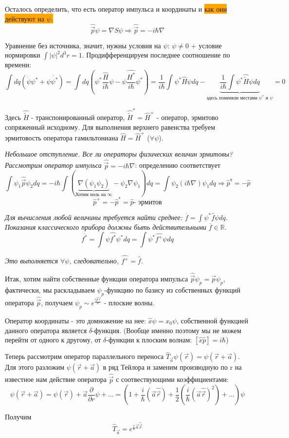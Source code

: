 \par Осталось определить, что есть оператор импульса и координаты и  \colorbox{orange}{как они действуют на $\psi$.}
$$ \hat{\vec{p}} \psi = \nabla S \psi  \Longrightarrow \hat{\vec{p}} = -i \hbar \nabla  $$
\par Уравнение без источника, значит, нужны условия на $\psi$:  $\psi \ne 0 $ + условие нормировки $\int |\psi|^2 d^3r = 1$. Продифференцируем последнее соотношение по времени:
$$ \int dq (\dot{\psi} \psi^{*} +\psi \dot{\psi^{*}}) = \int dq ( \psi^{*} \frac{\hat{H}}{i \hbar} \psi - \psi \frac{\hat{H^*}}{i \hbar} \psi^*) =\frac{1}{i \hbar} \int \psi^*\hat{H} \psi dq - \underbrace{\frac{1}{i \hbar} \int \psi^*\hat{\widetilde{H}} \psi dq}_{\text{здесь поменяли местами } \psi^* \text{ и }\psi} = 0 $$
\par Здесь $\hat{\widetilde{H}}$ - транспонированный оператор, $\hat{\widetilde{H}}^* = \hat{H}^+$ - оператор, эрмитово сопряженный исходному. Для выполнения верхнего равенства требуем эрмитовость оператора гамильтониана $\hat{H}=\hat{H}^+$ ($\forall \psi$). 
\par \textit{Небольшое отступление. Все ли операторы физических величин эрмитовы? Рассмотрим оператор импульса} $\hat{\vec{p}} = -i \hbar \nabla$: определению соответствует $$ \int \psi_1 \hat{\vec{p}} \psi_2 dq = -i \hbar \int (\underbrace{\nabla (\psi_1 \psi_2)}_{\text{Хотим ноль на }\infty} - \psi_2 \nabla \psi_1) dq = \int \psi_2 (i \hbar \nabla)\psi_1 dq \Longrightarrow \hat{p}^т=-\hat{p} $$
$$ \hat{p}^+ = -\hat{p}^* = \hat{p} \text{- эрмитов}$$
\par \textit{Для вычисления любой величины требуется найти среднее: $\overline{f}=\int \psi^* \hat{f} \psi dq$. Показания классического прибора должны быть действительными} $ \overline{f} \in \mathbb{R}$. 
$$ \overline{f^*}= \int \psi \hat{f^*} \psi^* dq = \int \psi^* \hat{f^+} \psi dq$$
\par \textit{Это выполняется $\forall \psi$, следовательно, $\hat{f^+} = \hat{f}$.}

\par Итак, хотим найти собственные функции оператора импульса $ \hat{\vec{p}} \psi_p = \vec{p} \psi _p $, фактически, мы раскладываем $\psi_p$-функцию по базису из собственных функций оператора $\hat{\vec{p}}$, получаем $\psi_p \sim e^{\frac{i\vec{p}\vec{r}}{\hbar}}$ - плоские волны.
\par Оператор координаты - это домножение на нее: $\hat{x} \psi = x_0 \psi$, собственной функцией данного оператора является $\delta$-функция. (Вообще именно поэтому мы не можем перейти от одного к другому, от $\delta$-функции к плоским волнам: $[\hat{x}\hat{p}]=i\hbar$)
\par Теперь рассмотрим оператор параллельного переноса $\hat{T}_{\vec{a}} \psi (\vec{r}) = \psi ( \vec{r} + \vec{a} )$. Для этого разложим $\psi (\vec{r}+\vec{a})$ в ряд Тейлора и заменим производную по r на известное нам действие оператора $\hat{\vec{p}}$ с соотвествующими коэффициентами:
$$\psi (\vec{r}+\vec{a}) = \psi (\vec{r}) + \vec{a} \frac{\partial}{\partial r} \psi + ... = (1+\frac{i}{\hbar}(\vec{a}\hat{\vec{r}}) + \frac{1}{2}(\frac{i}{\hbar}(\vec{a}\hat{\vec{r}})^2) +...)\psi $$
\par Получим $$\hat{T}_{\vec{a}} = e^{\frac{i}{\hbar}\vec{a}\hat{\vec{r}}}$$
